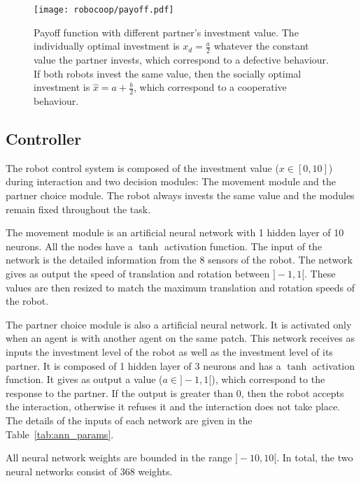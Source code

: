 \begin{figure}[htpb]
    \centering
    \texttt{[image: robocoop/payoff.pdf]}
    \caption{Payoff function with different partner's investment value. The individually optimal investment is $x_d = \frac{a}{2}$ whatever the constant value the partner invests, which correspond to a defective behaviour. If both robots invest the same value, then the socially optimal investment is $\hat{x} = a + \frac{b}{2}$, which correspond to a cooperative behaviour.}
    \label{fig:payoff}
\end{figure}

\subsection{Controller}

The robot control system is composed of the investment value ($x \in [0, 10]$) during interaction and two decision modules: The movement module and the partner choice module. The robot always invests the same value and the modules remain fixed throughout the task. 

The movement module is an artificial neural network with 1 hidden layer of 10 neurons. All the nodes have a $\tanh$ activation function. The input of the network is the detailed information from the 8 sensors of the robot. The network gives as output the speed of translation and rotation between $]-1, 1[$. These values are then resized to match the maximum translation and rotation speeds of the robot.

The partner choice module is also a artificial neural network. It is activated only when an agent is with another agent on the same patch. This network receives as inputs the investment level of the robot as well as the investment level of its partner. It is composed of 1 hidden layer of 3 neurons and has a $\tanh$ activation function. It gives as output a value ($a \in ]-1, 1[$), which correspond to the response to the partner. If the output is greater than 0, then the robot accepts the interaction, otherwise it refuses it and the interaction does not take place.  The details of the inputs of each network are given in the Table~\ref{tab:ann_params}.

All neural network weights are bounded in the range $]-10, 10[$. In total, the two neural networks consist of 368 weights.

